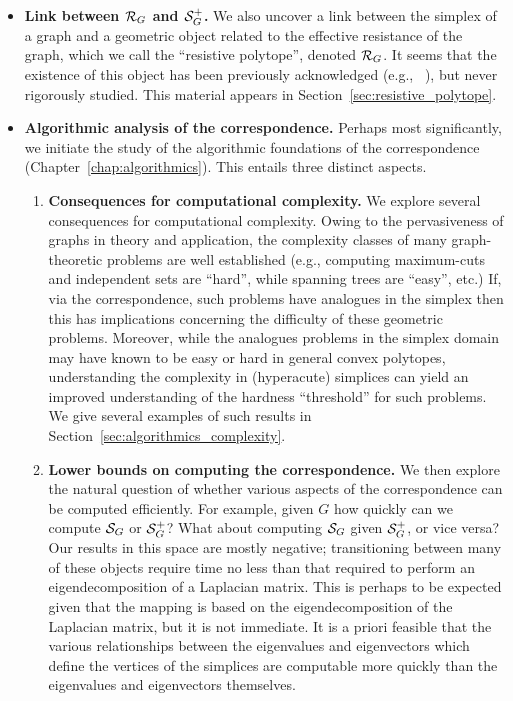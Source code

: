 \begin{itemize}
	
	\item {\bf Link between $\mathcal{R}_G$ and $\mathcal{S}_G^+$.} We also uncover a link between the simplex of a graph and a geometric  object related to the effective resistance of the graph, which we call the ``resistive polytope'', denoted $\mathcal{R}_G$. It seems that the existence of this object has been previously acknowledged (e.g., ~\cite{shayanNotes}), but never rigorously studied. This material appears in Section~\ref{sec:resistive_polytope}. 
	
	\item {\bf Algorithmic analysis of the correspondence.} Perhaps most significantly, we initiate the study of the algorithmic foundations of the correspondence (Chapter~\ref{chap:algorithmics}). This entails three distinct aspects. 
	\begin{enumerate}
		\item {\bf Consequences for computational complexity.}	We explore several consequences for computational  complexity.  Owing to the pervasiveness of graphs in theory and application, the complexity classes of many graph-theoretic problems are  well established (e.g., computing maximum-cuts and independent sets are ``hard'', while spanning trees are ``easy'', etc.) If, via the correspondence, such problems have analogues in the simplex then this has implications concerning the difficulty of these geometric problems. Moreover, while the analogues problems in the simplex domain may have known to be easy or hard  in general convex polytopes, understanding the complexity in (hyperacute) simplices can yield an improved understanding of the hardness ``threshold'' for such problems. We give several examples of such results in Section~\ref{sec:algorithmics_complexity}. 
		\item {\bf Lower bounds on computing the correspondence.} We then explore the natural question of whether various aspects of the correspondence can be computed efficiently. For example, given $G$ how quickly can we compute $\mathcal{S}_G$ or $\mathcal{S}_G^+$? What about computing $\mathcal{S}_G$ given $\mathcal{S}_G^+$, or vice  versa? Our results in this  space are mostly negative; transitioning between many of these objects require time no less than that required to perform an eigendecomposition of a Laplacian matrix. 
		This is perhaps to be expected given that the mapping is based on the eigendecomposition of the Laplacian matrix, but it is not immediate.  It is a priori  feasible that the various relationships between the eigenvalues and eigenvectors which define the vertices of  the simplices are computable more quickly than the eigenvalues and eigenvectors  themselves. 

\end{enumerate}
\end{itemize}
